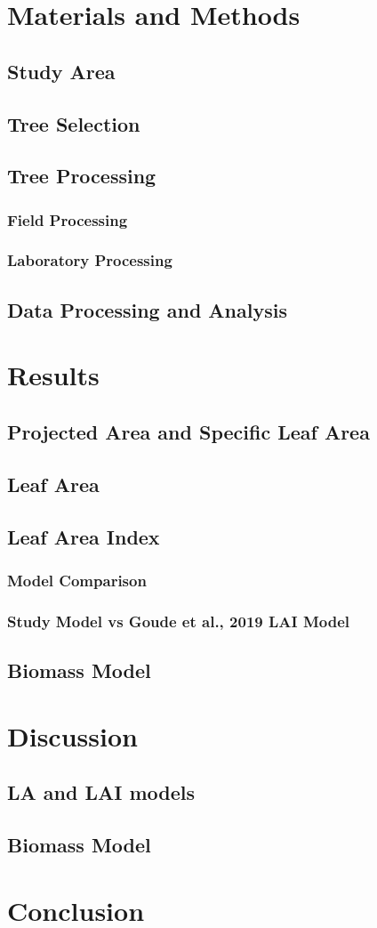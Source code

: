 \documentclass[11pt, a4paper]{report}
\begin{document}
\chapter{Materials and Methods}
\section{Study Area}
\section{Tree Selection}
\section{Tree Processing}
\subsection{Field Processing}
\subsection{Laboratory Processing}
\section{Data Processing and Analysis}

\chapter{Results}
\section{Projected Area and Specific Leaf Area}
\section{Leaf Area}
\section{Leaf Area Index}
\subsection{Model Comparison}
\subsection{Study Model vs Goude et al., 2019 LAI Model}
\section{Biomass Model}

\chapter{Discussion}
\section{LA and LAI models}
\section{Biomass Model}

\chapter{Conclusion}
\end{document}
